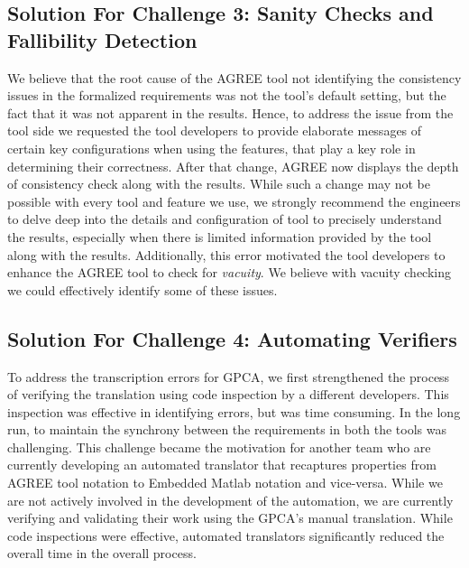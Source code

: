%


\subsection {Solution For Challenge 3: Sanity Checks and Fallibility Detection}

We believe that the root cause of the AGREE tool not identifying the consistency issues in the formalized requirements was not the tool's default setting, but the fact that it was not apparent in the results. Hence, to address the issue from the tool side we requested the tool developers to provide elaborate messages of certain key configurations when using the features, that play a key role in determining their correctness. After that change, AGREE now displays the depth of consistency check along with the results. While such a change may not be possible with every tool and feature we use, we strongly recommend the engineers to delve deep into the details and configuration of tool to precisely understand the results, especially when there is limited information provided by the tool along with the results. Additionally, this error motivated the tool developers to enhance the AGREE tool to check for \emph{vacuity}. We believe with vacuity checking we could effectively identify some of these issues. 

\subsection {Solution For Challenge 4: Automating Verifiers}

To address the transcription errors for GPCA, we first strengthened the process of verifying the translation using code inspection by a different developers. This inspection was effective in identifying errors, but was time consuming. In the long run, to maintain the synchrony between the requirements in both the tools was challenging. This challenge became the motivation for another team who are currently developing an automated translator that recaptures properties from AGREE tool notation to Embedded Matlab notation and vice-versa. While we are not actively involved in the development of the automation, we are currently verifying and validating their work using the GPCA's manual translation. While code inspections were effective, automated translators significantly reduced the overall time in the overall process. 